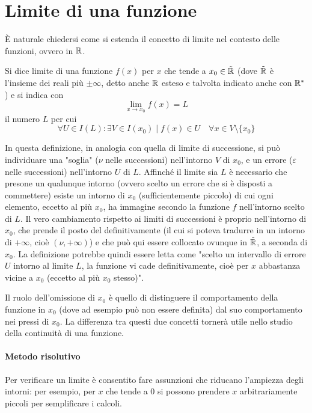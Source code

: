 \section{Limite di una funzione}
È naturale chiedersi come si estenda il concetto di limite nel contesto delle funzioni, ovvero in $\mathbb{R}$.
\begin{defin}
	Si dice limite di una funzione $f(x)$ per $x$ che tende a $x_0\in\tilde{\mathbb{R}}$ (dove $\tilde{\mathbb{R}}$ è l'insieme dei reali più $\pm\infty$, detto anche $\mathbb{R}$ esteso e talvolta indicato anche con $\mathbb{R}^*$) e si indica con
	\[
		\lim_{x\to x_0} f(x)=L
	\]
	il numero $L$ per cui
	\[
		\forall U\in I(L): \exists V\in I(x_0)\mid f(x)\in U \quad\forall x\in V\setminus\{x_0\}
	\]
\end{defin}
In questa definizione, in analogia con quella di limite di successione, si può individuare una "soglia" ($\nu$ nelle successioni) nell'intorno $V$ di $x_0$, e un errore ($\varepsilon$ nelle successioni) nell'intorno $U$ di $L$. Affinché il limite sia $L$ è necessario che presone un qualunque intorno (ovvero scelto un errore che si è disposti a commettere) esiste un intorno di $x_0$ (sufficientemente piccolo) di cui ogni elemento, eccetto al più $x_0$, ha immagine secondo la funzione $f$ nell'intorno scelto di $L$. Il vero cambiamento rispetto ai limiti di successioni è proprio nell'intorno di $x_0$, che prende il posto del definitivamente (il cui si poteva tradurre in un intorno di $+\infty$, cioè $(\nu, +\infty)$) e che può qui essere collocato ovunque in $\tilde{\mathbb{R}}$, a seconda di $x_0$. La definizione potrebbe quindi essere letta come "scelto un intervallo di errore $U$ intorno al limite $L$, la funzione vi cade definitivamente, cioè per $x$ abbastanza vicine a $x_0$ (eccetto al più $x_0$ stesso)".

Il ruolo dell'omissione di $x_0$ è quello di distinguere il comportamento della funzione in $x_0$ (dove ad esempio può non essere definita) dal suo comportamento nei pressi di $x_0$. La differenza tra questi due concetti tornerà utile nello studio della continuità di una funzione.

\paragraph{Metodo risolutivo}
\label{lim:metodo}
Per verificare un limite è consentito fare assunzioni che riducano l'ampiezza degli intorni: per esempio, per $x$ che tende a $0$ si possono prendere $x$ arbitrariamente piccoli per semplificare i calcoli.


